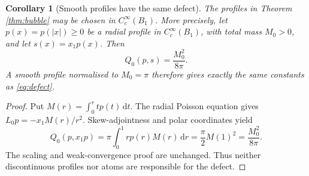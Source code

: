 \documentclass[11pt,a4paper]{article}
\newtheorem{corollary}[theorem]{Corollary}
\theoremstyle{definition}\newtheorem{definition}[theorem]{Definition}
\theoremstyle{remark}\newtheorem{remark}[theorem]{Remark}
\newcommand{\dd}{\,\mathrm d}
\numberwithin{equation}{section}
\begin{document}
\begin{corollary}[Smooth profiles have the same defect]\label{cor:smooth}
The profiles in Theorem \ref{thm:bubble} may be chosen in $C_c^\infty(B_1)$. More precisely, let $p(x)=p(|x|)\ge0$ be a radial profile in $C_c^\infty(B_1)$, with total mass $M_0>0$, and let $s(x)=x_1p(x)$. Then
\begin{equation}\label{eq:smoothmass}
 Q_0(p,s)=\frac{M_0^2}{8\pi}.
\end{equation}
A smooth profile normalised to $M_0=\pi$ therefore gives exactly the same constants as \eqref{eq:defect}.
\end{corollary}
\begin{proof}
Put $M(r)=\int_0^r t p(t)\dd t$. The radial Poisson equation gives
$L_0p=-x_1M(r)/r^2$. Skew-adjointness and polar coordinates yield
\[
 Q_0(p,x_1p)=\pi\int_0^1r p(r)M(r)\dd r
 =\frac\pi2M(1)^2=\frac{M_0^2}{8\pi}.
\]
The scaling and weak-convergence proof are unchanged. Thus neither discontinuous profiles nor atoms are responsible for the defect.
\end{proof}
\end{document}
